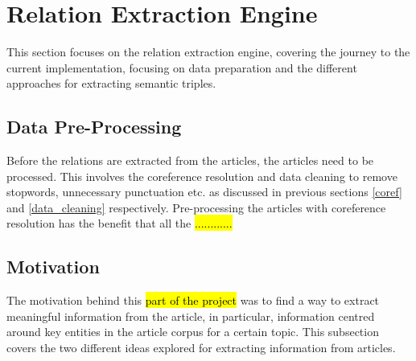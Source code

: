 \chapter{Relation Extraction Engine}

This section focuses on the relation extraction engine, covering the journey to the current implementation, focusing on data preparation and the different approaches for extracting semantic triples.

\section{Data Pre-Processing}

Before the relations are extracted from the articles, the articles need to be processed. This involves the coreference resolution and data cleaning to remove stopwords, unnecessary punctuation etc. as discussed in previous sections \ref{coref} and \ref{data_cleaning} respectively. Pre-processing the articles with coreference resolution has the benefit that all the \hl{............}


\section{Motivation}
The motivation behind this \hl{part of the project} was to find a way to extract meaningful information from the article, in particular, information centred around key entities in the article corpus for a certain topic. This subsection covers the two different ideas explored for extracting information from articles. 

